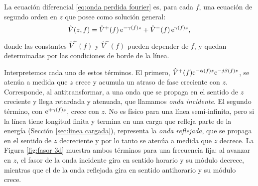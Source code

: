 La ecuación diferencial \eqref{eq:onda perdida fourier} es, para cada $f$, una ecuación de segundo orden en $z$ que posee como solución general:
\begin{equation}\label{eq:solucion V}
    \hat{V}(z,f) = \hat{V}^+(f)\, \mathrm{e}^{-\gamma(f) z} + \hat{V}^-(f)\, \mathrm{e}^{\gamma(f) z},
\end{equation}
donde las constantes $\hat{V}^+(f)$ y $\hat{V}^-(f)$ pueden depender de $f$, y quedan determinadas por las condiciones de borde de la línea.

Interpretemos cada uno de estos términos. El primero, $\hat{V}^+(f)\mathrm{e}^{-\alpha(f) z}\mathrm{e}^{-j\beta(f) z}$, se atenúa a medida que $z$ crece y acumula un atraso de fase creciente con $z$. Corresponde, al antitransformar, a una onda que se propaga en el sentido de $z$ creciente y llega retardada y atenuada, que llamamos \emph{onda incidente}. El segundo término, con $\mathrm{e}^{+\gamma(f) z}$, crece con $z$. No es físico para una línea semi-infinita, pero si la línea tiene longitud finita y termina en una carga que refleja parte de la energía (Sección \ref{sec:linea cargada}), representa la \emph{onda reflejada}, que se propaga en el sentido de $z$ decreciente y por lo tanto se atenúa a medida que $z$ decrece. La Figura \ref{fig:fasor 3d} muestra ambos términos para una frecuencia fija: al avanzar en $z$, el fasor de la onda incidente gira en sentido horario y su módulo decrece, mientras que el de la onda reflejada gira en sentido antihorario y su módulo crece.

